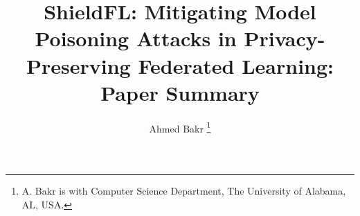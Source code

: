 \documentclass[conference]{IEEEtran}
\title{ShieldFL: Mitigating Model Poisoning Attacks in Privacy-Preserving Federated Learning: Paper Summary}
\author{Ahmed Bakr \IEEEmembership{Student Member, IEEE}
\thanks{A. Bakr is with Computer Science Department, The University of Alabama, AL, USA.}
}
\begin{document}
\maketitle


\acresetall %



 








\end{document}
